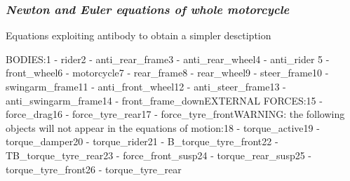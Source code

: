 \documentclass{article}
\begin{document}
\subsubsection{\textbf{\textit{Newton and Euler equations of whole motorcycle}}}
\begin{maplegroup}
\begin{Maple Normal}{
Equations exploiting antibody to obtain a simpler desctiption}\end{Maple Normal}

\end{maplegroup}
\begin{maplegroup}
\begin{mapleinput}
\end{mapleinput}
\mapleresult
BODIES:1 - rider2 - anti\_rear\_frame3 - anti\_rear\_wheel4 - anti\_rider
5 - front\_wheel6 - motorcycle7 - rear\_frame8 - rear\_wheel9 - steer\_frame10 - swingarm\_frame11 - anti\_front\_wheel12 - anti\_steer\_frame13 - anti\_swingarm\_frame14 - front\_frame\_downEXTERNAL FORCES:15 - force\_drag16 - force\_tyre\_rear17 - force\_tyre\_frontWARNING: the following objects will not appear in the equations of motion:18 - torque\_active19 - torque\_damper20 - torque\_rider21 - B\_torque\_tyre\_front22 - TB\_torque\_tyre\_rear23 - force\_front\_susp24 - torque\_rear\_susp25 - torque\_tyre\_front26 - torque\_tyre\_rear\mapleresult
\begin{maplelatex}
\end{maplelatex}
\end{maplegroup}
\begin{maplegroup}
\begin{mapleinput}
\end{mapleinput}
\end{maplegroup}
\begin{maplegroup}
\begin{mapleinput}
\end{mapleinput}
\mapleresult
\begin{maplelatex}
\end{maplelatex}
\end{maplegroup}
\end{document}
